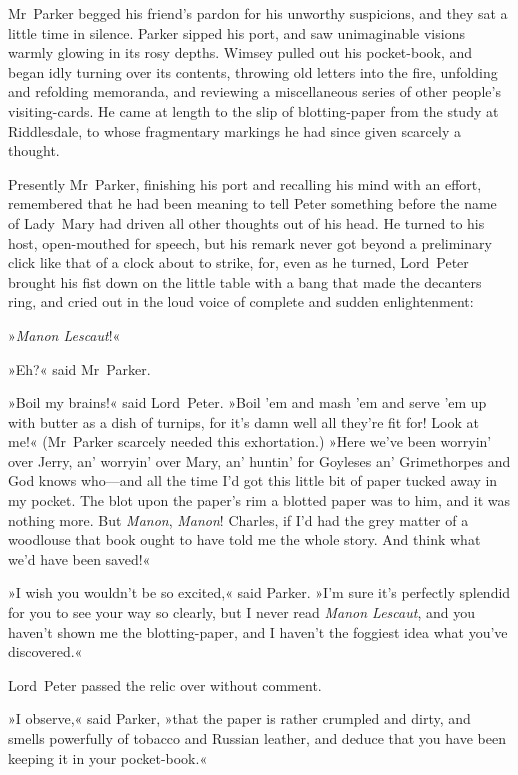 Mr~Parker begged his friend's pardon for his unworthy suspicions, and they sat a little time in silence. Parker sipped his port, and saw unimaginable visions warmly glowing in its rosy depths. Wimsey pulled out his pocket-book, and began idly turning over its contents, throwing old letters into the fire, unfolding and refolding memoranda, and reviewing a miscellaneous series of other people's visiting-cards. He came at length to the slip of blotting-paper from the study at Riddlesdale, to whose fragmentary markings he had since given scarcely a thought.

Presently Mr~Parker, finishing his port and recalling his mind with an effort, remembered that he had been meaning to tell Peter something before the name of Lady~Mary had driven all other thoughts out of his head. He turned to his host, open-mouthed for speech, but his remark never got beyond a preliminary click like that of a clock about to strike, for, even as he turned, Lord~Peter brought his fist down on the little table with a bang that made the decanters ring, and cried out in the loud voice of complete and sudden enlightenment:

»\textit{Manon Lescaut}!«

»Eh?« said Mr~Parker.

»Boil my brains!« said Lord~Peter. »Boil 'em and mash 'em and serve 'em up with butter as a dish of turnips, for it's damn well all they're fit for! Look at me!« (Mr~Parker scarcely needed this exhortation.) »Here we've been worryin' over Jerry, an' worryin' over Mary, an' huntin' for Goyleses an' Grimethorpes and God knows who—and all the time I'd got this little bit of paper tucked away in my pocket. The blot upon the paper's rim a blotted paper was to him, and it was nothing more. But \textit{Manon}, \textit{Manon}! Charles, if I'd had the grey matter of a woodlouse that book ought to have told me the whole story. And think what we'd have been saved!«

»I wish you wouldn't be so excited,« said Parker. »I'm sure it's perfectly splendid for you to see your way so clearly, but I never read \textit{Manon Lescaut}, and you haven't shown me the blotting-paper, and I haven't the foggiest idea what you've discovered.«

Lord~Peter passed the relic over without comment.

»I observe,« said Parker, »that the paper is rather crumpled and dirty, and smells powerfully of tobacco and Russian leather, and deduce that you have been keeping it in your pocket-book.«

